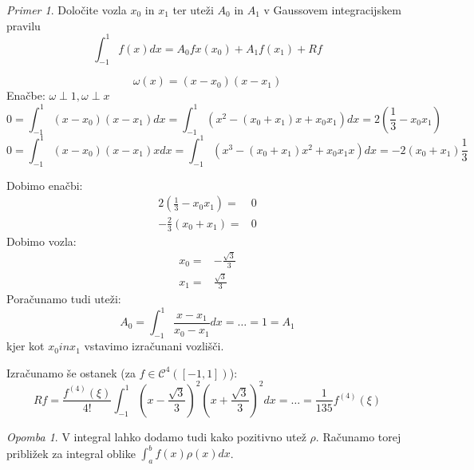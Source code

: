 \documentclass[a4paper,12pt]{article}
\theoremstyle{definition}
\theoremstyle{remark}
\newtheorem*{ex}{Primer}
\newtheorem*{rem}{Opomba}
\begin{document}
\begin{ex}
    Določite vozla $x_0$ in $x_1$ ter uteži $A_0$ in $A_1$ v Gaussovem integracijskem pravilu
    \begin{equation*}
        \int_{-1}^{1} f(x) dx = A_0 fx(x_0) + A_1 f(x_1) + Rf
    \end{equation*}

    \begin{equation*}
        \omega(x) = (x-x_0)(x-x_1)
    \end{equation*}
    Enačbe: $\omega \perp 1, \omega \perp x$
    \begin{equation*}
        0 = \int_{-1}^{1}(x-x_0)(x-x_1) dx = \int_{-1}^{1} (x^2 - (x_0 + x_1) x + x_0x_1) dx = 2(\frac{1}{3} - x_0x_1)
    \end{equation*}
    \begin{equation*}
        0 = \int_{-1}^{1}(x-x_0)(x-x_1)x dx = \int_{-1}^{1} (x^3 - (x_0 + x_1) x^2 + x_0x_1x) dx = -2(x_0 + x_1) \frac{1}{3}
    \end{equation*}

    Dobimo enačbi:
    \begin{align*}
        2(\frac{1}{3} - x_0x_1) =& 0\\
        - \frac{2}{3}(x_0 + x_1) =& 0
    \end{align*}
    Dobimo vozla:
    \begin{align*}
        x_0 =& - \frac{\sqrt{3}}{3} \\
        x_1 =& \frac{\sqrt{3}}{3}
    \end{align*}
    Poračunamo tudi uteži:
    \begin{equation*}
        A_0 = \int_{-1}^{1} \frac{x-x_1}{x_0-x_1} dx = \dots = 1 = A_1
    \end{equation*}
    kjer kot $x_0 in x_1$ vstavimo izračunani vozlišči.

    Izračunamo še ostanek (za $f \in \mathscr{C}^4([-1, 1])$):
    \begin{equation*}
        Rf = \frac{f^{(4)} (\xi)}{4!} \int_{-1}^{1} (x-\frac{\sqrt{3}}{3})^2 (x + \frac{\sqrt{3}}{3})^2 dx = \dots = \frac{1}{135} f^{(4)} (\xi)
    \end{equation*}
\end{ex}

\begin{rem}
    V integral lahko dodamo tudi kako pozitivno utež $\rho$. Računamo torej približek za integral oblike $\int_{a}^{b} f(x) \rho(x) dx$.
\end{rem}
\end{document}

